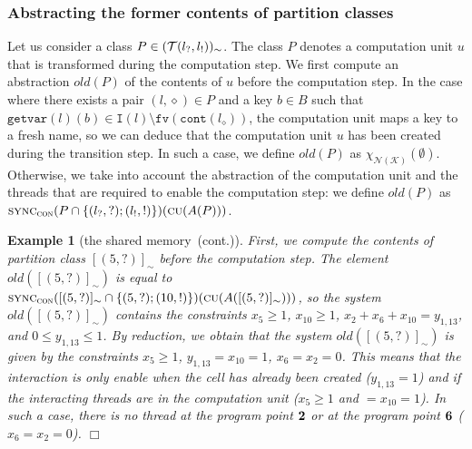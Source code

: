 \documentclass{article}
\newcommand{\boxexample}{$\Box$}
\newtheorem{example}[thm]{Example}
\newcommand{\rec}{?}
\newcommand{\eme}{!}
\newcommand{\pp}[1]{$\bf{#1}$}
\newcommand{\memlaba}{1}
\newcommand{\memlabb}{2}
\newcommand{\memlabe}{5}
\newcommand{\memlabf}{6}
\newcommand{\memlabj}{10}
\newcommand{\memlabm}{13}
\newcommand{\FN}{\texttt{fv}}
\newcommand{\interface}{\mathtt{I}}
\newcommand{\cont}{\texttt{cont}}
\newcommand{\lrec}{l_{\rec}}
\newcommand{\leme}{l_{\eme}}
\newcommand{\continued}{(cont.)}
\newcommand{\giveindex}{\texttt{getvar}}
\newcommand{\shareanalysis}{the shared memory}
\newcommand{\tp}{\textsc{cu}}
\newcommand{\var}{\mathcal{K}}
\newcommand{\numkey}{\textsc{con}}
\newcommand{\abstnum}{\mathcal{N}(\var)}
\newcommand{\xinum}{\chi_{\abstnum}}
\newcommand{\syncnume}{\textsc{sync}_{\numkey}}
\newcommand{\ccontentanalysis}{\shareanalysis\ \continued}
\begin{document}
\subsubsection{Abstracting the former contents of partition classes}

Let us consider a class $P\in\classes$. 
The class $P$ denotes a computation unit $u$ that is transformed during the computation step. 
We first compute an abstraction $\textit{old}(P)$ of the contents of $u$ before the computation step. 
In the case where there exists a pair $(l,\diamond)\in P$ and a key $b\in B$ such that $\giveindex(l)(b)\in \interface(l)\setminus \FN(\cont(l_\diamond))$,  the computation unit maps a key to a fresh name, 
so we can deduce that the computation unit $u$ has been created during the transition step. In such a case, we define $\textit{old}(P)$ as $\xinum(\emptyset)$. Otherwise, we take into account the abstraction of the computation unit and the threads that are required to enable the computation step: we define $\textit{old}(P)$ as $\syncnume(P\cap \{(\lrec,\rec);(\leme,\eme)\})(\tp(A(P)))$.




\begin{example}[\ccontentanalysis]
First, we compute the contents of partition class $[(\memlabe,\rec)]_\sim$ before the computation step.
The  element  $\textit{old}([(\memlabe,\rec)]_\sim)$ is equal to 
$\syncnume([(\memlabe,\rec)]_{\sim}\cap \{(\memlabe,\rec);(\memlabj,\eme)\})(\tp(A([(\memlabe,\rec)]_\sim)))$, so the system $\textit{old}([(\memlabe,\rec)]_\sim)$ contains the constraints  $x_{\memlabe}\geq 1$, $x_{\memlabj}\geq 1$, 
$x_{\memlabb} + x_{\memlabf} + x_{\memlabj} = y_{\memlaba,\memlabm}$, and 
$0 \leq y_{\memlaba,\memlabm} \leq 1$. By reduction, we obtain that the system  $\textit{old}([(\memlabe,\rec)]_\sim)$ is given by the constraints $x_{\memlabe}\geq 1$, $y_{\memlaba,\memlabm}=x_{\memlabj}=1$, $x_{\memlabf}=x_{\memlabb}=0$.  
This means that the interaction is only enable when the cell has already been created ($y_{\memlaba,\memlabm}=1$) and if the interacting threads are in the computation unit ($x_{\memlabe}\geq 1$ and $=x_{\memlabj}=1$). 
In such a case, there is no thread at the program point \pp{\memlabb} or at the program point \pp{\memlabf} ($x_{\memlabf}=x_{\memlabb}=0$). 
\boxexample\end{example}
\end{document}
